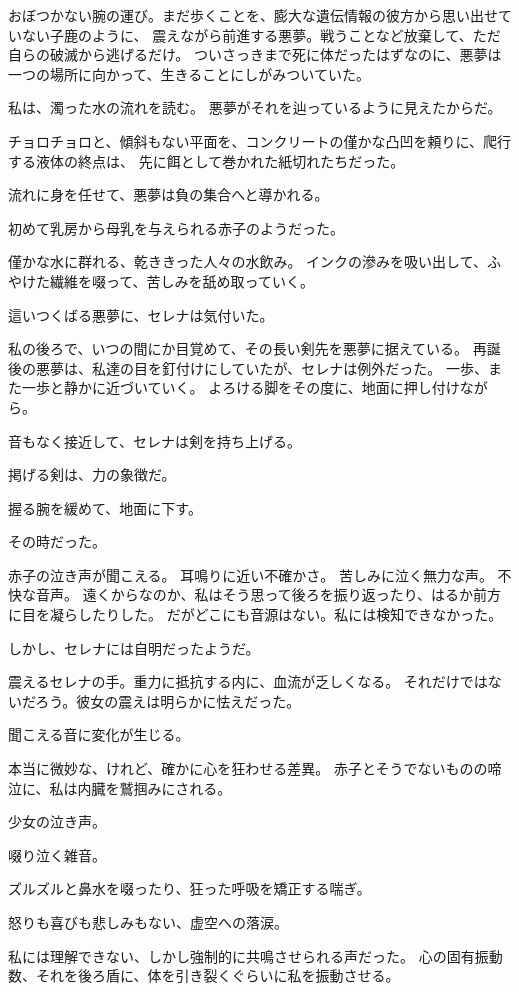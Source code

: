 \documentclass[../IHMain]{subfiles}
\begin{document}
おぼつかない腕の運び。まだ歩くことを、膨大な遺伝情報の彼方から思い出せていない子鹿のように、
震えながら前進する悪夢。戦うことなど放棄して、ただ自らの破滅から逃げるだけ。
ついさっきまで死に体だったはずなのに、悪夢は一つの場所に向かって、生きることにしがみついていた。

私は、濁った水の流れを読む。
悪夢がそれを辿っているように見えたからだ。

チョロチョロと、傾斜もない平面を、コンクリートの僅かな凸凹を頼りに、爬行する液体の終点は、
先に餌として巻かれた紙切れたちだった。

流れに身を任せて、悪夢は負の集合へと導かれる。

初めて乳房から母乳を与えられる赤子のようだった。

僅かな水に群れる、乾ききった人々の水飲み。
インクの滲みを吸い出して、ふやけた繊維を啜って、苦しみを舐め取っていく。

這いつくばる悪夢に、セレナは気付いた。

私の後ろで、いつの間にか目覚めて、その長い剣先を悪夢に据えている。
再誕後の悪夢は、私達の目を釘付けにしていたが、セレナは例外だった。
一歩、また一歩と静かに近づいていく。
よろける脚をその度に、地面に押し付けながら。

音もなく接近して、セレナは剣を持ち上げる。

掲げる剣は、力の象徴だ。

握る腕を緩めて、地面に下す。

その時だった。

赤子の泣き声が聞こえる。
耳鳴りに近い不確かさ。
苦しみに泣く無力な声。
不快な音声。
遠くからなのか、私はそう思って後ろを振り返ったり、はるか前方に目を凝らしたりした。
だがどこにも音源はない。私には検知できなかった。

しかし、セレナには自明だったようだ。

震えるセレナの手。重力に抵抗する内に、血流が乏しくなる。
それだけではないだろう。彼女の震えは明らかに怯えだった。

聞こえる音に変化が生じる。

本当に微妙な、けれど、確かに心を狂わせる差異。
赤子とそうでないものの啼泣に、私は内臓を鷲掴みにされる。

少女の泣き声。

啜り泣く雑音。

ズルズルと鼻水を啜ったり、狂った呼吸を矯正する喘ぎ。

怒りも喜びも悲しみもない、虚空への落涙。

私には理解できない、しかし強制的に共鳴させられる声だった。
心の固有振動数、それを後ろ盾に、体を引き裂くぐらいに私を振動させる。
\end{document}
